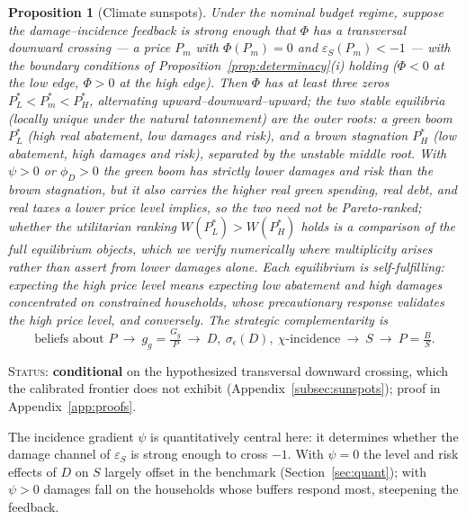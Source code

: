 \documentclass[12pt]{article}
\newtheorem{proposition}{Proposition}
\newcommand{\Sfun}{S}
\begin{document}
\begin{proposition}[Climate sunspots]\label{prop:sunspots}
Under the nominal budget regime, suppose the damage--incidence feedback is
strong enough that $\Phi$ has a transversal downward crossing --- a
price $P_m$ with $\Phi(P_m)=0$ and $\varepsilon_S(P_m)<-1$ --- with the
boundary conditions of Proposition~\ref{prop:determinacy}(i) holding
($\Phi<0$ at the low edge, $\Phi>0$ at the high edge). Then $\Phi$ has at
least three zeros $P_L^{*}<P_m^{*}<P_H^{*}$, alternating
upward--downward--upward; the two stable equilibria (locally unique
under the natural tatonnement) are the outer roots: a green boom
$P_L^{*}$ (high real abatement, low damages and risk), and a brown
stagnation $P_H^{*}$ (low abatement, high damages and risk), separated by
the unstable middle root. With $\psi>0$ or $\phi_D>0$ the green boom has strictly
lower damages and risk than the brown stagnation, but it also carries the
higher real green spending, real debt, and real taxes a lower price level
implies, so the two need not be Pareto-ranked; whether the utilitarian
ranking $W(P_L^{*})>W(P_H^{*})$ holds is a comparison of the full
equilibrium objects, which we verify numerically where multiplicity arises
rather than assert from lower damages alone. Each equilibrium is
self-fulfilling: expecting the high price
level means expecting low abatement and high damages concentrated on
constrained households, whose precautionary response validates the high price
level, and conversely. The strategic complementarity is
\begin{equation*}
\text{beliefs about } P \ \longrightarrow\ g_g=\tfrac{G_g}{P}
\ \longrightarrow\ D,\ \sigma_\epsilon(D),\ \chi\text{-incidence}
\ \longrightarrow\ \Sfun \ \longrightarrow\ P=\tfrac{B}{\Sfun}.
\end{equation*}
\end{proposition}
\noindent\textsc{Status:} \textbf{conditional} on the hypothesized transversal
downward crossing, which the calibrated frontier does not exhibit
(Appendix~\ref{subsec:sunspots}); proof in Appendix~\ref{app:proofs}.

The incidence gradient $\psi$ is quantitatively central here: it determines
whether the damage channel of $\varepsilon_S$ is strong enough to cross $-1$.
With $\psi=0$ the level and risk effects of $D$ on $\Sfun$ largely offset in
the benchmark (Section~\ref{sec:quant}); with $\psi>0$ damages fall on the
households whose buffers respond most, steepening the feedback.
\end{document}

